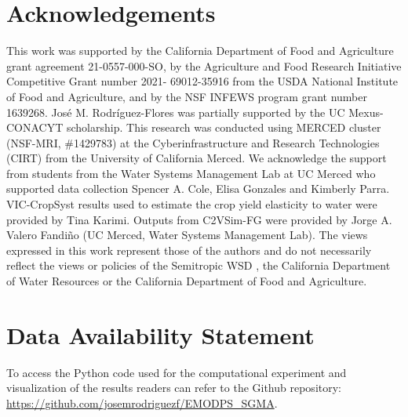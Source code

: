 \documentclass[a4paper,fleqn]{cas-sc}
\begin{document}
\section*{Acknowledgements}

This work was supported by the California Department of Food and Agriculture grant agreement 21-0557-000-SO, by the Agriculture and Food Research Initiative Competitive Grant number 2021- 69012-35916 from the USDA National Institute of Food and Agriculture, and by the NSF INFEWS program grant number 1639268. José M. Rodríguez-Flores was partially supported by the UC Mexus-CONACYT scholarship. This research was conducted using MERCED cluster (NSF-MRI, \#1429783) at the Cyberinfrastructure and Research Technologies (CIRT) from the University of California Merced. We acknowledge the support from students from the Water Systems Management Lab at UC Merced who supported data collection Spencer A. Cole, Elisa Gonzales and Kimberly Parra. VIC-CropSyst results used to estimate the crop yield elasticity to water were provided by Tina Karimi. Outputs from  C2VSim-FG were provided by Jorge A. Valero Fandiño (UC Merced, Water Systems Management Lab). The views expressed in this work represent those of the authors and do not necessarily reflect the views or policies of the Semitropic WSD , the California Department of Water Resources or the California Department of Food and Agriculture. 

\section*{Data Availability Statement}

To access the Python code used for the computational experiment and  visualization of the results readers can refer to the Github repository: \url{https://github.com/josemrodriguezf/EMODPS_SGMA}.

\printcredits


% 



\end{document}
